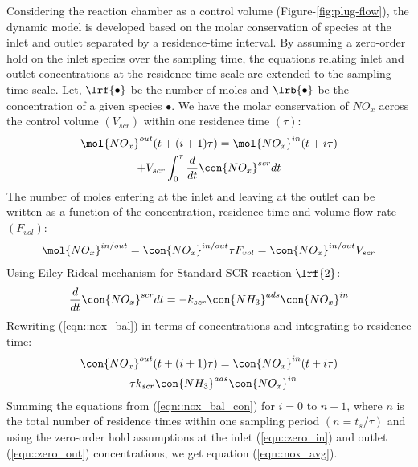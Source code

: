 Considering the reaction chamber as a control volume (Figure-\ref{fig:plug-flow}), the dynamic model is developed based
on the molar conservation of species at the inlet and outlet separated by a residence-time interval. By assuming a
zero-order hold on the inlet species over the sampling time, the equations relating inlet and outlet concentrations at
the residence-time scale are extended to the sampling-time scale.
Let, $\lrf{\bullet}$ be the number of moles and $\lrb{\bullet}$ be the concentration of a given species $\bullet$. We have the molar conservation of $NO_x$ across the control volume $(V_{scr})$ within one residence time $(\tau)$:
\begin{multline}
        \mol{NO_x}^{out} (t + (i+1) \tau) =
                \mol{NO_x}^{in} (t + i \tau) \\
                + V_{scr} \int_0^{\tau} \frac{d}{dt} \con{NO_x}^{scr}dt
        \label{eqn::nox_bal}
\end{multline}
The number of moles entering at the inlet and leaving at the outlet can be written as a function of the concentration, residence time and volume flow rate $(F_{vol})$:
\begin{align}
    \mol{NO_x}^{in/out} = \con{NO_x}^{in/out} \tau F_{vol} = \con{NO_x}^{in/out} V_{scr}
\end{align}
Using Eiley-Rideal mechanism for Standard SCR reaction $\lrf{2}$:
\begin{align}
    \frac{d}{dt} \con{NO_x}^{scr}dt = -k_{scr} \con{NH_3}^{ads} \con{NO_x}^{in}
\end{align}
Rewriting (\ref{eqn::nox_bal}) in terms of concentrations and integrating to residence time:
\begin{multline}
        \con{NO_x}^{out} (t + (i+1) \tau) =
                \con{NO_x}^{in} (t + i \tau) \\
                -\tau k_{scr} \con{NH_3}^{ads} \con{NO_x}^{in}
        \label{eqn::nox_bal_con}
\end{multline}
Summing the equations from (\ref{eqn::nox_bal_con}) for  $i = 0$ to $n-1$, where $n$ is the total number of residence times within one sampling period $(n= t_s/\tau)$ and using the zero-order hold assumptions at the inlet (\ref{eqn::zero_in}) and outlet (\ref{eqn::zero_out}) concentrations, we get equation (\ref{eqn::nox_avg}).
